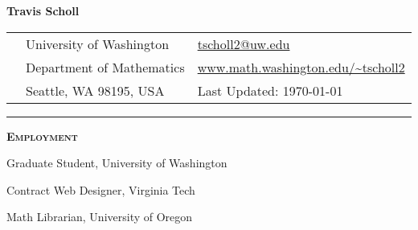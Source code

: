 \documentclass[12pt]{article}
\newcommand{\sectionheading}[1]
{
\bigskip %
\noindent
\hspace{-6.5mm}\textcolor{Gray}{\rule[.75mm]{21.5mm}{1mm}} %
\hspace{.2mm}	%
{\large{\textbf{\textsc{#1}}}} %
}
\newenvironment{date_section}
	{
	\vspace{-1ex}
	\leftmargini = 15ex
		\begin{itemize}[
			labelsep = *,
			labelwidth = 9ex,
			labelindent = 0ex,
			itemindent = !,
			font=\normalfont,
			align=parleft
		]{}
		\itemsep=-1.5mm
	}
	{\end{itemize}\vspace{-2ex}}
\newcommand{\yearrange}[2]{
	\item[
		{\makebox[1ex][r]{#1}}
		--
		{\makebox[1ex][l]{#2} }
		] }
\begin{document}

	\thispagestyle{empty}

	\centerline{{\LARGE \textbf{Travis Scholl}}}

	\vspace{3mm}

	\begin{center}
		\begin{tabular}[c]{lll} %
			\phantom{aaaaaaaaa} %
			& University of Washington
				& \url{tscholl2@uw.edu} \\
 			& Department of Mathematics
				& \url{www.math.washington.edu/~tscholl2}\\
 			& Seattle, WA 98195, USA
				& Last Updated: \today
		\end{tabular}
	\end{center}


	\sectionheading{Employment}%

		\begin{date_section}

			\yearrange{2013}{} Graduate Student,  University of Washington

			\yearrange{2015}{2016} Contract Web Designer, Virginia Tech


			\yearrange{2012}{2013} Math Librarian, University of Oregon






		\end{date_section}
\end{document}
